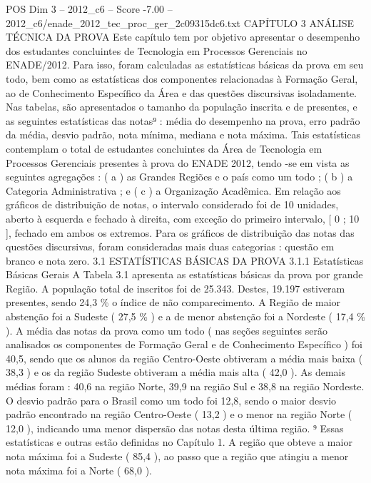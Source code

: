 \begin{textsample}{POS Dim 3 – 2012\_c6 – Score -7.00 – 2012\_c6/enade\_2012\_tec\_proc\_ger\_2c09315dc6.txt}  \label{ex:f3_pos_259}
CAPÍTULO 3 ANÁLISE TÉCNICA DA PROVA Este capítulo tem por objetivo apresentar o desempenho dos estudantes concluintes de Tecnologia em Processos Gerenciais no ENADE/2012.
Para isso, foram calculadas as estatísticas básicas da prova em seu todo, bem como as estatísticas dos componentes relacionadas à Formação Geral, ao de Conhecimento Específico da Área e das questões discursivas isoladamente.
Nas tabelas, são apresentados o tamanho da população inscrita e de presentes, e as seguintes estatísticas das notas⁹ : média do desempenho na prova, erro padrão da média, desvio padrão, nota mínima, mediana e nota máxima.
Tais estatísticas contemplam o total de estudantes concluintes da Área de Tecnologia em Processos Gerenciais presentes à prova do ENADE 2012, tendo -se em vista as seguintes agregações : ( a ) as Grandes Regiões e o país como um todo ; ( b ) a Categoria Administrativa ; e ( c ) a Organização Acadêmica.
Em relação aos gráficos de distribuição de notas, o intervalo considerado foi de 10 unidades, aberto à esquerda e fechado à direita, com exceção do primeiro intervalo, [ 0 ; 10 ], fechado em ambos os extremos.
Para os gráficos de distribuição das notas das questões discursivas, foram consideradas mais duas categorias : questão em branco e nota zero. 3.1 ESTATÍSTICAS BÁSICAS DA PROVA 3.1.1 Estatísticas Básicas Gerais A Tabela 3.1 apresenta as estatísticas básicas da prova por grande Região.
A população total de inscritos foi de 25.343.
Destes, 19.197 estiveram presentes, sendo 24,3 \% o índice de não comparecimento.
A Região de maior abstenção foi a Sudeste ( 27,5 \% ) e a de menor abstenção foi a Nordeste ( 17,4 \% ).
A média das notas da prova como um todo ( nas seções seguintes serão analisados os componentes de Formação Geral e de Conhecimento Específico ) foi 40,5, sendo que os alunos da região Centro-Oeste obtiveram a média mais baixa ( 38,3 ) e os da região Sudeste obtiveram a média mais alta ( 42,0 ).
As demais médias foram : 40,6 na região Norte, 39,9 na região Sul e 38,8 na região Nordeste.
O desvio padrão para o Brasil como um todo foi 12,8, sendo o maior desvio padrão encontrado na região Centro-Oeste ( 13,2 ) e o menor na região Norte ( 12,0 ), indicando uma menor dispersão das notas desta última região. ⁹ Essas estatísticas e outras estão definidas no Capítulo 1.
A região que obteve a maior nota máxima foi a Sudeste ( 85,4 ), ao passo que a região que atingiu a menor nota máxima foi a Norte ( 68,0 ).

\end{textsample}

